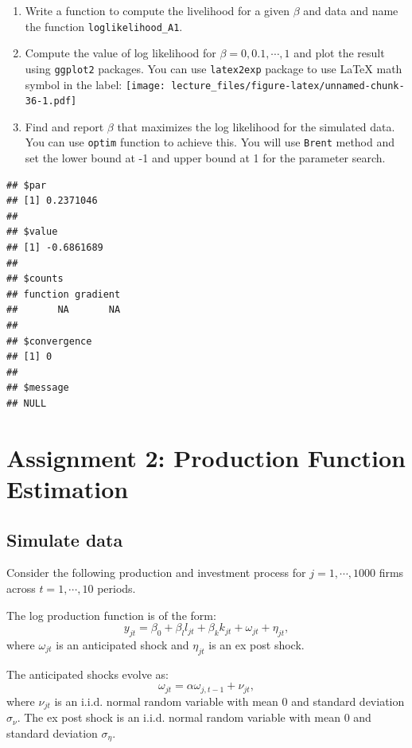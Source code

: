 \documentclass[
]{book}
\begin{document}
\begin{enumerate}
\def\labelenumi{\arabic{enumi}.}
\item
  Write a function to compute the livelihood for a given \(\beta\) and data and name the function \texttt{loglikelihood\_A1}.
\item
  Compute the value of log likelihood for \(\beta = 0, 0.1, \cdots, 1\) and plot the result using \texttt{ggplot2} packages. You can use \texttt{latex2exp} package to use LaTeX math symbol in the label:
  \texttt{[image: lecture\_files/figure-latex/unnamed-chunk-36-1.pdf]}
\item
  Find and report \(\beta\) that maximizes the log likelihood for the simulated data. You can use \texttt{optim} function to achieve this. You will use \texttt{Brent} method and set the lower bound at -1 and upper bound at 1 for the parameter search.
\end{enumerate}

\begin{verbatim}
## $par
## [1] 0.2371046
## 
## $value
## [1] -0.6861689
## 
## $counts
## function gradient 
##       NA       NA 
## 
## $convergence
## [1] 0
## 
## $message
## NULL
\end{verbatim}

\hypertarget{assignment2}{%
\chapter{Assignment 2: Production Function Estimation}\label{assignment2}}

\hypertarget{simulate-data-1}{%
\section{Simulate data}\label{simulate-data-1}}

Consider the following production and investment process for \(j = 1, \cdots, 1000\) firms across \(t = 1, \cdots, 10\) periods.

The log production function is of the form:
\[
y_{jt} = \beta_0 + \beta_l l_{jt} + \beta_k k_{jt} + \omega_{jt} + \eta_{jt},
\]
where \(\omega_{jt}\) is an anticipated shock and \(\eta_{jt}\) is an ex post shock.

The anticipated shocks evolve as:
\[
\omega_{jt} = \alpha \omega_{j, t - 1} + \nu_{jt},
\]
where \(\nu_{jt}\) is an i.i.d. normal random variable with mean 0 and standard deviation \(\sigma_\nu\). The ex post shock is an i.i.d. normal random variable with mean 0 and standard deviation \(\sigma_{\eta}\).
\end{document}
